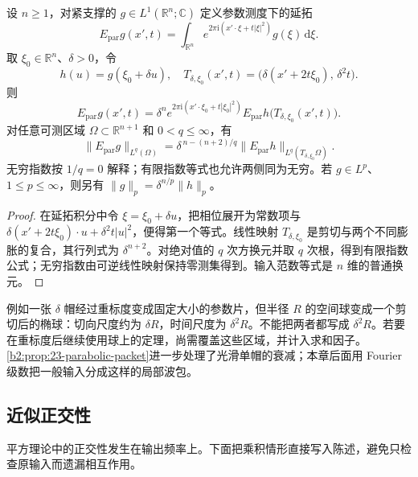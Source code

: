 \begin{proposition}[抛物面的重标度]\label{b2:prop:25-parabolic-rescaling}
设 \(n\geq1\)，对紧支撑的 \(g\in L^1(\mathbb R^n;\mathbb C)\) 定义参数测度下的延拓
\[
 E_{\mathrm{par}}g(x',t)
 =\int_{\mathbb R^n}e^{2\pi\mathrm i(x'\cdot\xi+t|\xi|^2)}
                       g(\xi)\,\mathrm d\xi.
\]
取 \(\xi_0\in\mathbb R^n\)、\(\delta>0\)，令
\[
 h(u)=g(\xi_0+\delta u),
 \quad
 T_{\delta,\xi_0}(x',t)
 =\bigl(\delta(x'+2t\xi_0),\,\delta^2t\bigr).
\]
则
\[
 E_{\mathrm{par}}g(x',t)
 =\delta^n e^{2\pi\mathrm i(x'\cdot\xi_0+t|\xi_0|^2)}
       E_{\mathrm{par}}h\bigl(T_{\delta,\xi_0}(x',t)\bigr).
\]
对任意可测区域 \(\Omega\subset\mathbb R^{n+1}\) 和 \(0<q\leq\infty\)，有
\[
 \|E_{\mathrm{par}}g\|_{L^q(\Omega)}
 =\delta^{\,n-(n+2)/q}
       \|E_{\mathrm{par}}h\|_{L^q(T_{\delta,\xi_0}\Omega)}.
\]
无穷指数按 \(1/q=0\) 解释；有限指数等式也允许两侧同为无穷。若 \(g\in L^p\)、\(1\leq p\leq\infty\)，则另有
\(\|g\|_p=\delta^{n/p}\|h\|_p\)。
\end{proposition}
\begin{proof}
在延拓积分中令 \(\xi=\xi_0+\delta u\)，把相位展开为常数项与
\(\delta(x'+2t\xi_0)\cdot u+\delta^2t|u|^2\)，便得第一个等式。线性映射 \(T_{\delta,\xi_0}\) 是剪切与两个不同膨胀的复合，其行列式为 \(\delta^{n+2}\)。对绝对值的 \(q\) 次方换元并取 \(q\) 次根，得到有限指数公式；无穷指数由可逆线性映射保持零测集得到。输入范数等式是 \(n\) 维的普通换元。
\end{proof}

例如一张 \(\delta\) 帽经过重标度变成固定大小的参数片，但半径 \(R\) 的空间球变成一个剪切后的椭球：切向尺度约为 \(\delta R\)，时间尺度为 \(\delta^2R\)。不能把两者都写成 \(\delta^2R\)。若要在重标度后继续使用球上的定理，尚需覆盖这些区域，并计入求和因子。\cref{b2:prop:23-parabolic-packet}进一步处理了光滑单帽的衰减；本章后面用 Fourier 级数把一般输入分成这样的局部波包。

\subsection{近似正交性}
\label{b2:subsec:250104}

平方理论中的正交性发生在输出频率上。下面把乘积情形直接写入陈述，避免只检查原输入而遗漏相互作用。

